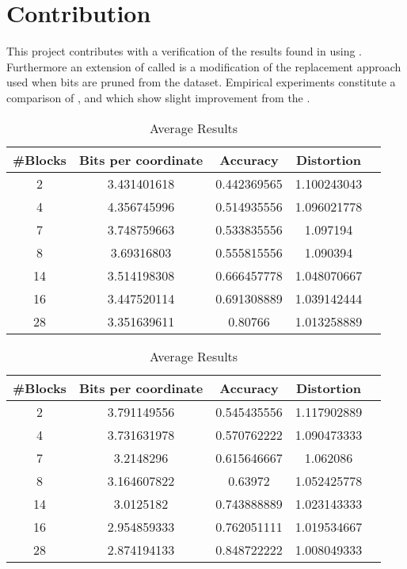 \section{Contribution}
\label{contribution}
This project contributes with a verification of the results found in \cite{wagner17} using \qs{}. Furthermore an extension of \qs{} called \qsr{} is a modification of the replacement approach used when bits are pruned from the dataset. Empirical experiments constitute a comparison of \qs{}, \grid{} and \qsr{} which show slight improvement from the \qs{}.

\begin{table}[h!]
	\centering
	\caption{Average Results \mnist{} \qs{}}
	\label{table:avg_mnist_qs}
	\begin{tabular}{ccccc}
		\hline
		\#Blocks & Bits per coordinate & Accuracy  & Distortion \\ \hline
		2 & 3.431401618 & 0.442369565 & 1.100243043  \\
		4 & 4.356745996 & 0.514935556 & 1.096021778  \\
		7 & 3.748759663 & 0.533835556 & 1.097194 \\
		8 & 3.69316803 & 0.555815556 & 1.090394 \\
		14 & 3.514198308 & 0.666457778 & 1.048070667 \\
		16 & 3.447520114 & 0.691308889 & 1.039142444 \\
		28 & 3.351639611 & 0.80766 & 1.013258889 \\
		\hline
	\end{tabular}
\end{table}

\begin{table}[h!]
	\centering
	\caption{Average Results \mnist{} \qsr{}}
	\label{table:avg_mnist_qsr}
	\begin{tabular}{ccccc}
		\hline
		\#Blocks & Bits per coordinate & Accuracy  & Distortion \\ \hline
		2 & 3.791149556 & 0.545435556 & 1.117902889  \\
		4 & 3.731631978 & 0.570762222 & 1.090473333  \\
		7 & 3.2148296 & 0.615646667 & 1.062086 \\
		8 & 3.164607822 & 0.63972 & 1.052425778 \\
		14 & 3.0125182 & 0.743888889 & 1.023143333 \\
		16 & 2.954859333 & 0.762051111 & 1.019534667 \\
		28 & 2.874194133 & 0.848722222 & 1.008049333 \\
		\hline
	\end{tabular}
\end{table}

